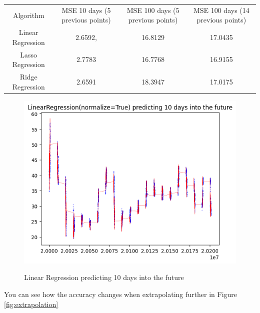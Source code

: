 \documentclass{report}
\begin{document}
\begin{minipage} {\linewidth}
\centering
\small
\setlength\tabcolsep{2pt}
\bigskip
{}
\resizebox{1 \textwidth}{!} {
\begin{tabular}{c | c | c | c}
    Algorithm & MSE 10 days (5 previous points) & MSE 100 days (5 previous points) & MSE 100 days (14 previous points) \\
    Linear Regression & 2.6592, & 16.8129 & 17.0435 \\
    Lasso Regression & 2.7783 & 16.7768 & 16.9155 \\
    Ridge Regression & 2.6591 & 18.3947 & 17.0175
\end{tabular}
}
\bigskip
\end{minipage}

\begin{figure}
    \caption{Linear Regression predicting 10 days into the future}
    \centering
    \includegraphics[scale=0.5]{10_day_regression.png}
    \label{fig:regression}
\end{figure}

You can see how the accuracy changes when extrapolating further in Figure \ref{fig:extrapolation}
\end{document}
